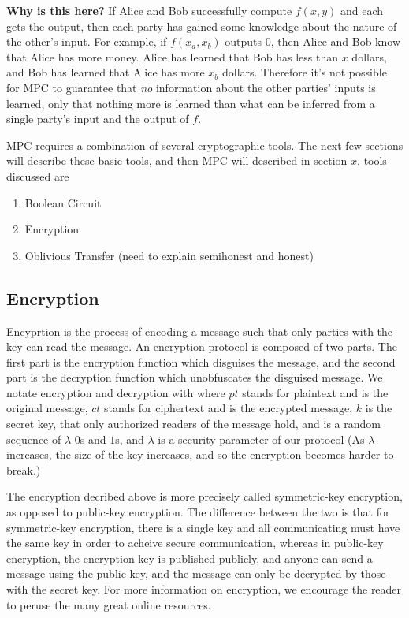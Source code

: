 \documentclass[12pt,twoside]{reedthesis}
\newcommand{\Enc}{\operatorname{Enc}}
\newcommand{\Dec}{\operatorname{Dec}}
\begin{document}
\textbf{Why is this here?}
If Alice and Bob successfully compute $f(x,y)$ and each gets the output, then each party has gained some knowledge about the nature of the other's input.
For example, if $f(x_a,x_b)$ outputs $0$, then Alice and Bob know that Alice has more money.
Alice has learned that Bob has less than $x$ dollars, and Bob has learned that Alice has more $x_b$ dollars.
Therefore it's not possible for MPC to guarantee that \textit{no} information about the other parties' inputs is learned, only that nothing more is learned than what can be inferred from a single party's input and the output of $f$. 

MPC requires a combination of several cryptographic tools.
The next few sections will describe these basic tools, and then MPC will described in section $x$. 
tools discussed are 
\begin{enumerate}
    \item Boolean Circuit
    \item Encryption
    \item Oblivious Transfer (need to explain semihonest and honest)
\end{enumerate}

\subsection{Encryption}
Encyprtion is the process of encoding a message such that only parties with the key can read the message.
An encryption protocol is composed of two parts.
The first part is the encryption function which disguises the message, and the second part is the decryption function which unobfuscates the disguised message.
We notate encryption and decryption with
where $pt$ stands for plaintext and is the original message, $ct$ stands for ciphertext and is the encrypted message, $k$ is the secret key, that only authorized readers of the message hold, and is a random sequence of $\lambda$ $0$s and $1$s, and $\lambda$ is a security parameter of our protocol (As $\lambda$ increases, the size of the key increases, and so the encryption becomes harder to break.)

The encryption decribed above is more precisely called symmetric-key encryption, as opposed to public-key encryption.
The difference between the two is that for symmetric-key encryption, there is a single key and all communicating must have the same key in order to acheive secure communication, whereas in public-key encryption, the encryption key is published publicly, and anyone can send a message using the public key, and the message can only be decrypted by those with the secret key.
For more information on encryption, we encourage the reader to peruse the many great online resources.
\end{document}
